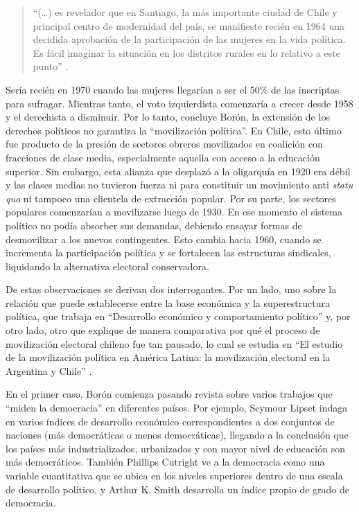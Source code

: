 {\begin{quote}
\enquote{(\dots) es revelador que en Santiago, la más importante ciudad de Chile y principal centro de modernidad del país, se manifieste recién en 1964 una decidida aprobación de la participación de las mujeres en la vida política. Es fácil imaginar la situación en los distritos rurales en lo relativo a este punto} \parencite[27]{1571-BORON1970}.
\end{quote}

Sería recién en 1970 cuando las mujeres llegarían a ser el 50\% de las inscriptas para sufragar. Mientras tanto, el voto izquierdista comenzaría a crecer desde 1958 y el derechista a disminuir. Por lo tanto, concluye Borón, la extensión de los derechos políticos no garantiza la \enquote{movilización política}. En Chile, esto último fue producto de la presión de sectores obreros movilizados en coalición con fracciones de clase media, especialmente aquella con acceso a la educación superior. Sin embargo, esta alianza que desplazó a la oligarquía en 1920 era débil y las clases medias no tuvieron fuerza ni para constituir un movimiento anti \emph{statu quo} ni tampoco una clientela de extracción popular. Por su parte, los sectores populares comenzarían a movilizarse luego de 1930. En ese momento el sistema político no podía absorber sus demandas, debiendo ensayar formas de desmovilizar a los nuevos contingentes. Esto cambia hacia 1960, cuando se incrementa la participación política y se fortalecen las estructuras sindicales, liquidando la alternativa electoral conservadora.

De estas observaciones se derivan dos interrogantes. Por un lado, uno sobre la relación que puede establecerse entre la base económica y la superestructura política, que \textcite{1572-BORON1970} trabaja en \enquote{Desarrollo económico y comportamiento político} y, por otro lado, otro que explique de manera comparativa por qué el proceso de movilización electoral chileno fue tan pausado, lo cual se estudia en \enquote{El estudio de la movilización política en América Latina: la movilización electoral en la Argentina y Chile} \parencite{1573-BORON1972}.

En el primer caso, Borón comienza pasando revista sobre varios trabajos que \enquote{miden la democracia} en diferentes países. Por ejemplo, Seymour Lipset indaga en varios índices de desarrollo económico correspondientes a dos conjuntos de naciones (más democráticas o menos democráticas), llegando a la conclusión que los países más industrializados, urbanizados y con mayor nivel de educación son más democráticos. También Phillips Cutright ve a la democracia como una variable cuantitativa que se ubica en los niveles superiores dentro de una escala de desarrollo político, y Arthur K. Smith desarrolla un índice propio de grado de democracia.

}
